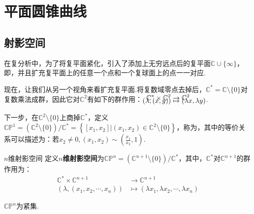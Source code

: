 \chapter{平面圆锥曲线}

\section{射影空间}

在复分析中，为了将复平面紧化，引入了添加上无穷远点后的复平面$\mathbb{C}\cup\{\infty\}$，即，并且扩充复平面上的任意一个点和一个复球面上的点一一对应.\par
现在，让我们从另一个视角来看扩充复平面.将复数域零点去掉后，$\mathbb{C}^*=\mathbb{C}\setminus\{0\}$对复数乘法成群，因此它对$\mathbb{C}^2$有如下的群作用：$\setjot[-8]\begin{aligned}
    \mathbb{C}^* \times \mathbb{C}^2 &\to \mathbb{C}^2 \\
    (\lambda,(x,y)) &\mapsto (\lambda x,\lambda y)
\end{aligned}$.\par
下一步，在$\mathbb{C}^2\setminus\{0\}$上商掉$\mathbb{C}^*$，定义$\mathbb{C}\mathbb{P}^1=\left(\mathbb{C}^2\setminus\{0\}\right)/\mathbb{C}^* = \left\{ [x_1,x_2] | (x_1,x_2)\in \mathbb{C}^2\setminus\{0\}\right\}$，称为，其中的等价关系可以描述为：若$x_2\neq 0,(x_1,x_2)\sim \left(\frac{x_1}{x_2},1\right)$.\par


\begin{definition}{$n$维射影空间}
    定义\textbf{$n$维射影空间}为$\mathbb{C}\mathbb{P}^n=\left(\mathbb{C}^{n+1}\setminus\{0\}\right)/\mathbb{C}^*$，其中，$\mathbb{C}^*$对$\mathbb{C}^{n+1}$的群作用为：
    \begin{align*}
        \mathbb{C}^*\times \mathbb{C}^{n+1} &\to \mathbb{C}^{n+1} \\
        (\lambda,(x_1,x_2,\cdots,x_n)) &\mapsto (\lambda x_1,\lambda x_2,\cdots,\lambda x_n)
    \end{align*}
\end{definition}
\begin{remark}
    $\mathbb{C}\mathbb{P}^n$为紧集.
\end{remark}



